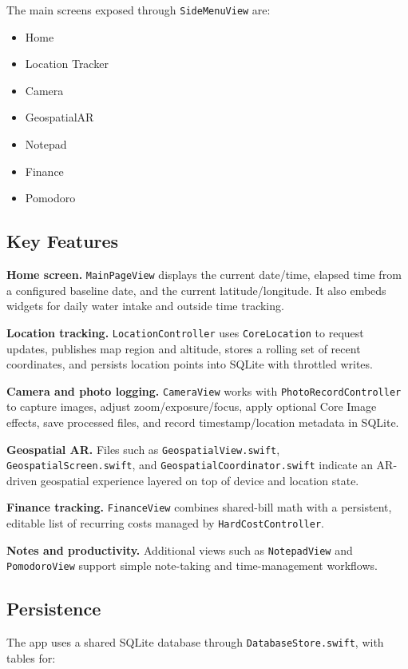 \documentclass[11pt]{article}
\begin{document}
The main screens exposed through \texttt{SideMenuView} are:

\begin{itemize}[leftmargin=*]
\item Home
\item Location Tracker
\item Camera
\item GeospatialAR
\item Notepad
\item Finance
\item Pomodoro
\end{itemize}

\subsection{Key Features}
\textbf{Home screen.} \texttt{MainPageView} displays the current date/time, elapsed time from a configured baseline date, and the current latitude/longitude. It also embeds widgets for daily water intake and outside time tracking.

\textbf{Location tracking.} \texttt{LocationController} uses \texttt{CoreLocation} to request updates, publishes map region and altitude, stores a rolling set of recent coordinates, and persists location points into SQLite with throttled writes.

\textbf{Camera and photo logging.} \texttt{CameraView} works with \texttt{PhotoRecordController} to capture images, adjust zoom/exposure/focus, apply optional Core Image effects, save processed files, and record timestamp/location metadata in SQLite.

\textbf{Geospatial AR.} Files such as \texttt{GeospatialView.swift}, \texttt{GeospatialScreen.swift}, and \texttt{GeospatialCoordinator.swift} indicate an AR-driven geospatial experience layered on top of device and location state.

\textbf{Finance tracking.} \texttt{FinanceView} combines shared-bill math with a persistent, editable list of recurring costs managed by \texttt{HardCostController}.

\textbf{Notes and productivity.} Additional views such as \texttt{NotepadView} and \texttt{PomodoroView} support simple note-taking and time-management workflows.

\subsection{Persistence}
The app uses a shared SQLite database through \texttt{DatabaseStore.swift}, with tables for:
\end{document}
